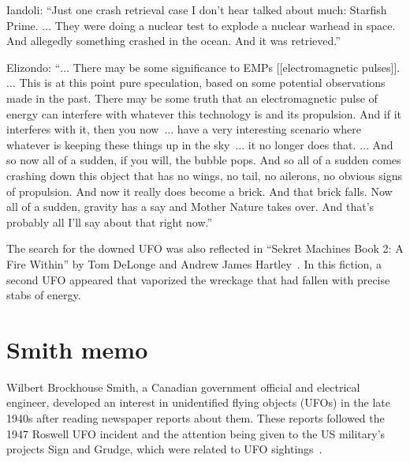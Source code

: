 \begin{svgraybox}
\noindent Iandoli: ``Just one crash retrieval case I don't hear talked about much: Starfish Prime. $\ldots $
They were doing a nuclear test to explode a nuclear warhead in space. And allegedly something
crashed in the ocean. And it was retrieved.''

\noindent Elizondo: ``$\ldots $ There may be some significance to EMPs [[electromagnetic pulses]]. $\ldots $
This is at this point pure speculation,
based on some potential observations made in the past. There may be some truth that an
electromagnetic pulse of energy can interfere with whatever this technology is and its propulsion. And
if it interferes with it, then you now~$\ldots $  have a very interesting scenario where whatever
is keeping these things up in the sky~$\ldots $  it no longer does that.
$\ldots $  And so now all of a sudden,
if you will, the bubble pops. And so all of a sudden comes crashing down this object that has no wings,
no tail, no ailerons, no obvious signs of propulsion. And now it really does become a brick. And that
brick falls. Now all of a sudden, gravity has a say and Mother Nature takes over. And that's probably
all I'll say about that right now.''
\end{svgraybox}

The search for the downed UFO was also reflected in ``Sekret Machines Book 2: {A} Fire Within'' by Tom DeLonge and Andrew James Hartley~\cite{DeLongeHartley-SM2}. In this fiction, a second UFO appeared that vaporized the wreckage that had fallen with precise stabs of energy.





\section{Smith memo}
\label{2023-UFO-part-Perception-crash-retreivals-SM}



Wilbert Brockhouse Smith, a Canadian government official and electrical engineer, developed an interest in unidentified flying objects (UFOs) in the late 1940s after reading newspaper reports about them. These reports followed the 1947 Roswell UFO incident and the attention being given to the US military's projects Sign and Grudge, which were related to UFO sightings~\cite{MatthewHayes-PhD}.

